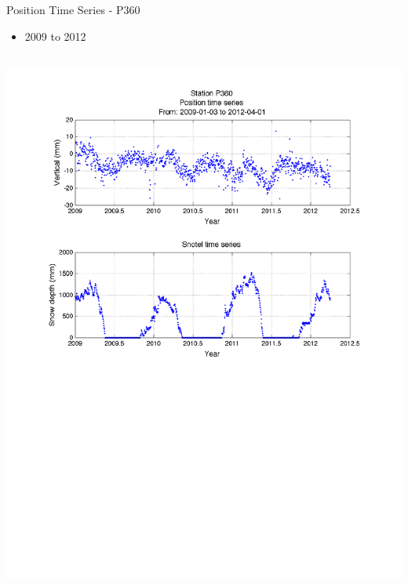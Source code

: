 \documentclass{beamer}
\begin{document}
\begin{frame}{Position Time Series - P360}
  \begin{itemize}
  \item 2009 to 2012\\
  \end{itemize}

  \begin{columns}
    \includegraphics[width=1\linewidth,trim=70 300 70 50, clip=true]{logan/p360_pos.pdf}


\end{columns}
\end{frame}
\end{document}
